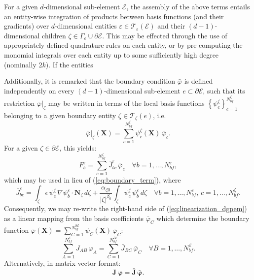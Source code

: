 	For a given $d$-dimensional sub-element $\mathcal{E}$, the assembly of the above terms entails an entity-wise integration of products between basis functions (and their gradients) over $d$-dimensional entities $\varepsilon \in \mathcal{T}_\varepsilon (\mathcal{E})$ and their $(d-1)$-dimensional children $\zeta \in \Gamma_\varepsilon \cup \partial \mathcal{E}$. This may be effected through the use of appropriately defined quadrature rules on each entity, or by pre-computing the monomial integrals over each entity up to some sufficiently high degree (nominally $2k$). If the entities
	
	Additionally, it is remarked that the boundary condition $\bar{\varphi}$ is defined independently on every $(d-1)$-dimensional sub-element $e \subset \partial \mathcal{E}$, such that its restriction $\bar{\varphi}|_\zeta$ may be written in terms of the local basis functions $\left\{ \psi^{\zeta}_c \right\}_{c=1}^{N^\zeta_{bf}}$ belonging to a given boundary entity $\zeta \in \mathcal{T}_{\zeta} (e)$, i.e.
	\begin{equation}
			\bar{\varphi}|_\zeta (\mathbf{X}) = \sum_{c=1}^{N^\zeta_{bf}} \psi^\zeta_c (\mathbf{X}) \, \bar{\varphi}_c.
	\end{equation}
	For a given $\zeta \in \partial \mathcal{E}$, this yields:
	\begin{equation}
		F^{\varepsilon}_b = \sum_{c=1}^{N^\zeta_{bf}} \bar{J}^{\varepsilon}_{bc} \, \bar{\varphi}_c \quad \forall b = 1, \ldots, N^{\varepsilon}_{bf},
	\end{equation}
	which may be used in lieu of (\ref{eq:boundary_term}), where
	\begin{equation}
		\bar{J}^{\varepsilon}_{bc} = \int_{\zeta} \epsilon \, \psi^\zeta_c \, \nabla \psi_b^{\varepsilon} \cdot \mathbf{N}_{\zeta} \, d \zeta + \frac{\alpha_{\zeta0}}{|\zeta|^{\beta_0}} \int_{\zeta} \psi^\zeta_c \, \psi_b^{\varepsilon} \, d \zeta \quad \forall b = 1, \ldots, N^{\varepsilon}_{bf}, \, c = 1, \ldots, N^\zeta_{bf}.
	\end{equation}
	Consequently, we may re-write the right-hand side of (\ref{eq:linearization_dgpem}) as a linear mapping from the basis coefficients $\bar{\varphi}_C$ which determine the boundary function $\bar{\varphi} (\mathbf{X}) = \sum_{C=1}^{N^{\partial \mathcal{E}}_{bf}} \psi_C (\mathbf{X}) \, \bar{\varphi}_C$:
	\begin{equation}
		\sum_{A=1}^{N^{\mathcal{E}}_{bf}} J_{AB} \, \varphi_A = \sum_{C=1}^{N^{\partial \mathcal{E}}_{bf}} \bar{J}_{BC} \, \bar{\varphi}_C \quad \forall B = 1, \ldots, N^{\mathcal{E}}_{bf}.
	\end{equation}
	Alternatively, in matrix-vector format:
	\begin{equation}
		\mathbf{J} \, \boldsymbol{\varphi} = \bar{\mathbf{J}} \, \bar{\boldsymbol{\varphi}}.
		\label{eq:dgpem_linear_system}
	\end{equation}
	
